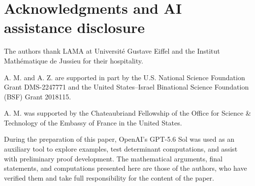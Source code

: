 \documentclass[11pt,a4paper]{amsart}
\theoremstyle{plain}
\theoremstyle{definition}
\begin{document}
\section*{Acknowledgments and AI assistance disclosure}

The authors thank LAMA at Université Gustave Eiffel and the Institut Mathématique de Jussieu for their hospitality. 

A. M. and A. Z. are supported in part by the U.S. National Science Foundation Grant DMS-2247771 and the United States--Israel Binational Science Foundation (BSF) Grant 2018115.

A. M. was supported by the Chateaubriand Fellowship of the Office for Science \& Technology of the Embassy of France in the United States.

During the preparation of this paper, OpenAI's GPT-5.6 Sol was used as an auxiliary tool to explore examples, test determinant computations, and assist with preliminary proof development. The mathematical arguments, final statements, and computations presented here are those of the authors, who have verified them and take full responsibility for the content of the paper.
\end{document}
